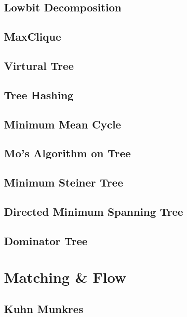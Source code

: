 \documentclass[a4paper,10pt,twocolumn,oneside]{article}
\begin{document}
\subsection{Lowbit Decomposition}

\subsection{MaxClique}

\subsection{Virtural Tree}

\subsection{Tree Hashing}

\subsection{Minimum Mean Cycle}

\subsection{Mo's Algorithm on Tree}

\subsection{Minimum Steiner Tree}

\subsection{Directed Minimum Spanning Tree}

\subsection{Dominator Tree}


\section{Matching \& Flow}
\subsection{Kuhn Munkres}

\end{document}
